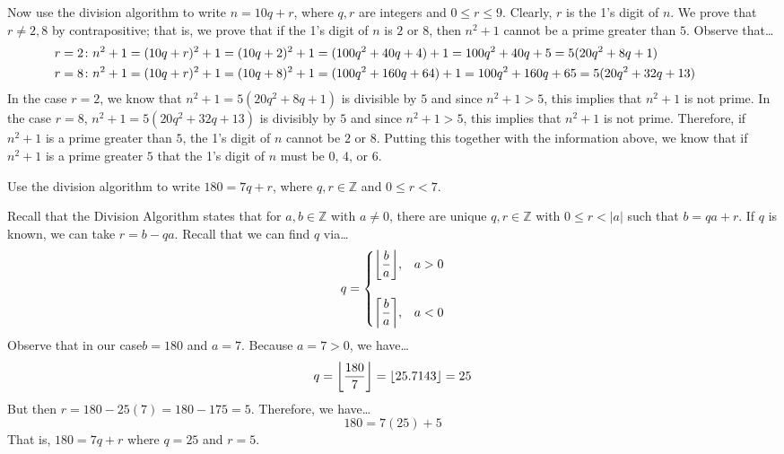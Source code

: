 \documentclass[11pt,letterpaper]{article}
\DeclarePairedDelimiter\ceil{\lceil}{\rceil}
\DeclarePairedDelimiter\floor{\lfloor}{\rfloor}
\begin{document}
Now use the division algorithm to write $n= 10q + r$, where $q, r$ are integers and $0 \leq r \leq 9$. Clearly, $r$ is the 1's digit of $n$. We prove that $r \neq 2, 8$ by contrapositive; that is, we prove that if the 1's digit of $n$ is $2$ or $8$, then $n^2 + 1$ cannot be a prime greater than $5$. Observe that\dots
	\[
	\begin{aligned}
	\hspace{-1cm} r= 2 &\colon n^2 + 1= (10q + r)^2 + 1= (10q + 2)^2 + 1= (100q^2 + 40q + 4) + 1= 100q^2 + 40q + 5= 5(20q^2 + 8q + 1) \\
	\hspace{-1cm} r= 8 &\colon n^2 + 1= (10q + r)^2 + 1= (10q + 8)^2 + 1= (100q^2 + 160q + 64) + 1= 100q^2 + 160q + 65= 5(20q^2 + 32q + 13)
	\end{aligned}
	\]
In the case $r= 2$, we know that $n^2 + 1= 5(20q^2 + 8q + 1)$ is divisible by $5$ and since $n^2 + 1 > 5$, this implies that $n^2 + 1$ is not prime. In the case $r= 8$, $n^2 + 1= 5(20q^2 + 32q + 13)$ is divisibly by $5$ and since $n^2 + 1 > 5$, this implies that $n^2 + 1$ is not prime. Therefore, if $n^2 + 1$ is a prime greater than $5$, the 1's digit of $n$ cannot be $2$ or $8$. Putting this together with the information above, we know that if $n^2 + 1$ is a prime greater $5$ that the 1's digit of $n$ must be $0$, $4$, or $6$. 



\newpage



 Use the division algorithm to write $180= 7q + r$, where $q, r \in \mathbb{Z}$ and $0 \leq r < 7$. \pspace

\sol Recall that the Division Algorithm states that for $a, b \in \mathbb{Z}$ with $a \neq 0$, there are unique $q, r \in \mathbb{Z}$ with $0 \leq r < |a|$ such that $b= qa + r$. If $q$ is known, we can take $r= b - qa$. Recall that we can find $q$ via\dots
	\[
	q= 
	\begin{cases}
	\floor*{\dfrac{b}{a}}, & a > 0 \\
	\\
	\ceil*{\dfrac{b}{a}}, & a < 0
	\end{cases}
	\]
Observe that in our case$b= 180$ and $a= 7$. Because $a= 7 > 0$, we have\dots
	\[
	q= \floor*{\dfrac{180}{7}}= \floor{25.7143}= 25
	\]
But then $r= 180 - 25(7)= 180 - 175= 5$. Therefore, we have\dots
	\[
	180= 7(25) + 5
	\]
That is, $180= 7q + r$ where $q= 25$ and $r= 5$. 



\newpage
\end{document}

